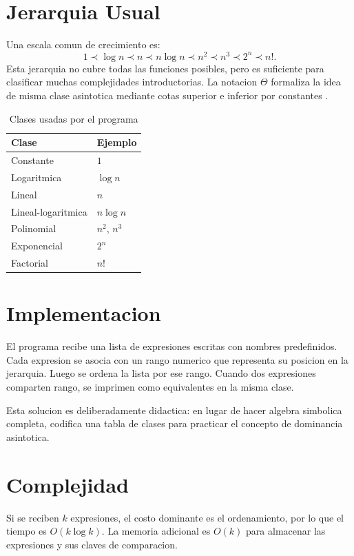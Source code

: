 \documentclass[conference]{IEEEtran}
\begin{document}
\section{Jerarquia Usual}
Una escala comun de crecimiento es:
\begin{equation}
1 \prec \log n \prec n \prec n\log n \prec n^2 \prec n^3 \prec 2^n \prec n!.
\end{equation}
Esta jerarquia no cubre todas las funciones posibles, pero es suficiente para
clasificar muchas complejidades introductorias. La notacion $\Theta$ formaliza
la idea de misma clase asintotica mediante cotas superior e inferior por
constantes \cite{nist_theta}.

\begin{table}[htbp]
\caption{Clases usadas por el programa}
\centering
\begin{tabular}{ll}
\toprule
Clase & Ejemplo \\
\midrule
Constante & $1$ \\
Logaritmica & $\log n$ \\
Lineal & $n$ \\
Lineal-logaritmica & $n\log n$ \\
Polinomial & $n^2$, $n^3$ \\
Exponencial & $2^n$ \\
Factorial & $n!$ \\
\bottomrule
\end{tabular}
\end{table}

\section{Implementacion}
El programa recibe una lista de expresiones escritas con nombres predefinidos.
Cada expresion se asocia con un rango numerico que representa su posicion en
la jerarquia. Luego se ordena la lista por ese rango. Cuando dos expresiones
comparten rango, se imprimen como equivalentes en la misma clase.

Esta solucion es deliberadamente didactica: en lugar de hacer algebra
simbolica completa, codifica una tabla de clases para practicar el concepto de
dominancia asintotica.

\section{Complejidad}
Si se reciben $k$ expresiones, el costo dominante es el ordenamiento, por lo
que el tiempo es $O(k\log k)$. La memoria adicional es $O(k)$ para almacenar
las expresiones y sus claves de comparacion.
\end{document}
